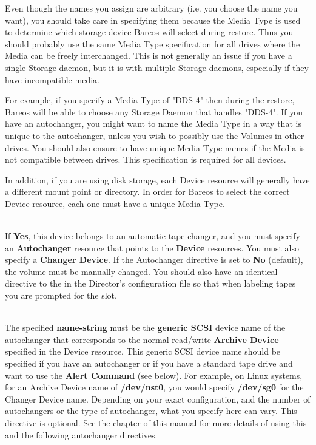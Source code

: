 \begin{description}
Even though the names you assign are arbitrary (i.e.  you choose the name
you want), you should take care in specifying them because the Media Type
is used to determine which storage device Bareos will select during
restore.  Thus you should probably use the same Media Type specification
for all drives where the Media can be freely interchanged.  This is not
generally an issue if you have a single Storage daemon, but it is with
multiple Storage daemons, especially if they have incompatible media.

For example, if you specify a Media Type of "DDS-4" then during the
restore, Bareos will be able to choose any Storage Daemon that handles
"DDS-4".  If you have an autochanger, you might want to name the Media Type
in a way that is unique to the autochanger, unless you wish to possibly use
the Volumes in other drives.  You should also ensure to have unique Media
Type names if the Media is not compatible between drives.  This
specification is required for all devices.

In addition, if you are using disk storage, each Device resource will
generally have a different mount point or directory. In order for
Bareos to select the correct Device resource, each one must have a
unique Media Type.

\label{Autochanger}
\item [Autochanger = {\textless}yes{\textbar}no{\textgreater}] \hfill \\
If {\bf Yes}, this device belongs to an automatic tape changer, and you
must specify an {\bf Autochanger} resource that points to the {\bf
Device} resources.  You must also specify a
{\bf Changer Device}.  If the Autochanger directive is set to {\bf
No} (default), the volume must be manually changed.  You should also
have an identical directive to the
  in the Director's
configuration file so that  when labeling tapes you are prompted for the slot.

\item [Changer Device = {\textless}name-string{\textgreater}] \hfill \\
The specified {\bf name-string} must be the {\bf generic SCSI} device
name of the autochanger that corresponds to the normal read/write
{\bf Archive Device}  specified in the Device resource. This
generic SCSI device name should be specified if you have an autochanger
or if you have a standard tape drive and want to use the
{\bf Alert Command} (see below). For example, on Linux systems, for
an Archive Device name of {\bf /dev/nst0}, you would specify {\bf
/dev/sg0} for the Changer Device name. Depending on your exact
configuration, and the number of autochangers or the type of
autochanger, what you specify here can vary.  This directive is
optional.  See the  chapter
of this manual for more details of using this and the following
autochanger directives.


\end{description}
